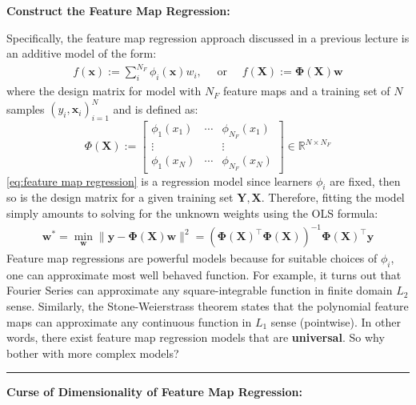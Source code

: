 \documentclass[11pt]{article}
\theoremstyle{plain} %
\theoremstyle{remark}
\begin{document}
\textbf{Construct the Feature Map Regression:}

Specifically, the feature map regression approach discussed in a previous lecture is an
additive model of the form:
\begin{align}
  f(\mathbf{x}):=\sum_{i}^{N_{F}} \phi_{i}(\mathbf{x}) w_{i}, \quad \text { or } \quad f(\mathbf{X}):=\mathbf{\Phi}(\mathbf{X}) \mathbf{w}
  \label{eq:feature map regression}
\end{align}
where the design matrix for model with $N_{F}$ feature maps and a training set
of $N$ samples $\left(y_{i}, \mathbf{x}_{i}\right)_{i=1}^{N}$ and is defined as:
$$
  \Phi(\mathbf{X}):=\left[\begin{array}{ccc}
      \phi_{1}\left(x_{1}\right) & \cdots & \phi_{N_{F}}\left(x_{1}\right) \\
      \vdots                     &        & \vdots                         \\
      \phi_{1}\left(x_{N}\right) & \cdots & \phi_{N_{F}}\left(x_{N}\right)
    \end{array}\right] \in \mathbb{R}^{N \times N_{F}}
$$
\cref{eq:feature map regression} is a regression model since learners $\phi_{i}$ are
fixed, then so is the design matrix for a given training set ${\mathbf{Y},
      \mathbf{X}}$. Therefore, fitting the model simply amounts to solving for the unknown weights
using the OLS formula:
\begin{align}
  \mathbf{w}^{*} =\min_{\mathbf{w}}\|\mathbf{y}-\mathbf{\Phi}(\mathbf{X}) \mathbf{w}\|^{2}
  =\left(\mathbf{\Phi}(\mathbf{X})^\top \mathbf{\Phi}(\mathbf{X})\right)^{-1} \mathbf{\Phi}(\mathbf{X})^\top \mathbf{y}
  \label{eq:feature map estimator}
\end{align}
Feature map regressions are powerful models because for suitable choices of
$\phi_{i}$, one can approximate most well behaved function.
For example, it turns out that Fourier Series can approximate any
square-integrable function in finite domain $L_{2}$ sense.
Similarly, the Stone-Weierstrass theorem states that the polynomial feature maps
can approximate any continuous function in $L_{1}$ sense (pointwise).
In other words, there exist feature map regression models that are \textbf{universal}. So
why bother with more complex models?
\vspace*{0.6em}
\hrule

\textbf{Curse of Dimensionality of Feature Map Regression:}
\end{document}
